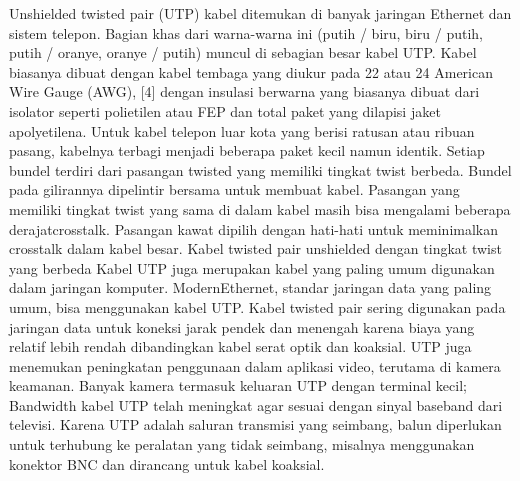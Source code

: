 Unshielded twisted pair (UTP) kabel ditemukan di banyak jaringan Ethernet dan sistem telepon. Bagian khas dari warna-warna ini (putih / biru, biru / putih, putih / oranye, oranye / putih) muncul di sebagian besar kabel UTP. Kabel biasanya dibuat dengan kabel tembaga yang diukur pada 22 atau 24 American Wire Gauge (AWG), [4] dengan insulasi berwarna yang biasanya dibuat dari isolator seperti polietilen atau FEP dan total paket yang dilapisi jaket apolyetilena. Untuk kabel telepon luar kota yang berisi ratusan atau ribuan pasang, kabelnya terbagi menjadi beberapa paket kecil namun identik. Setiap bundel terdiri dari pasangan twisted yang memiliki tingkat twist berbeda. Bundel pada gilirannya dipelintir bersama untuk membuat kabel. Pasangan yang memiliki tingkat twist yang sama di dalam kabel masih bisa mengalami beberapa derajatcrosstalk. Pasangan kawat dipilih dengan hati-hati untuk meminimalkan crosstalk dalam kabel besar. Kabel twisted pair unshielded dengan tingkat twist yang berbeda Kabel UTP juga merupakan kabel yang paling umum digunakan dalam jaringan komputer. ModernEthernet, standar jaringan data yang paling umum, bisa menggunakan kabel UTP. Kabel twisted pair sering digunakan pada jaringan data untuk koneksi jarak pendek dan menengah karena biaya yang relatif lebih rendah dibandingkan kabel serat optik dan koaksial. UTP juga menemukan peningkatan penggunaan dalam aplikasi video, terutama di kamera keamanan. Banyak kamera termasuk keluaran UTP dengan terminal kecil; Bandwidth kabel UTP telah meningkat agar sesuai dengan sinyal baseband dari televisi. Karena UTP adalah saluran transmisi yang seimbang, balun diperlukan untuk terhubung ke peralatan yang tidak seimbang, misalnya menggunakan konektor BNC dan dirancang untuk kabel koaksial.


